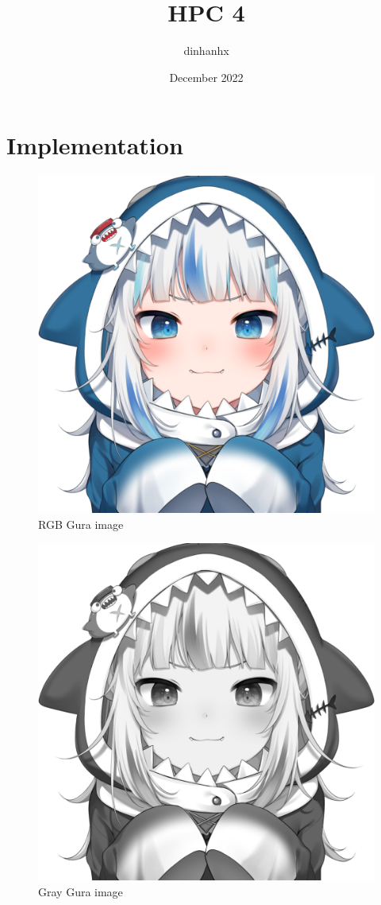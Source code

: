 \documentclass{article}
\title{HPC 4}
\author{dinhanhx }
\date{December 2022}
\begin{document}
\maketitle

\section{Implementation}

\begin{figure}[htbp]
    \centering
    \includegraphics[scale=0.8]{gura.png}
    \caption{RGB Gura image}
    \label{fig:rgb}
\end{figure}

\begin{figure}[htbp]
    \centering
    \includegraphics[scale=0.2]{gray_gura.png}
    \caption{Gray Gura image}
    \label{fig:gray}
\end{figure}
\end{document}
